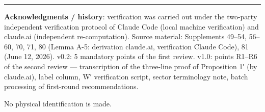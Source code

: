 \documentclass[
]{article}
\begin{document}
\begin{center}\rule{0.5\linewidth}{0.5pt}\end{center}

\textbf{Acknowledgments / history}: verification was carried out under
the two-party independent verification protocol of Claude Code (local
machine verification) and claude.ai (independent re-computation). Source
material: Supplements 49--54, 56--60, 70, 71, 80 (Lemma A-5: derivation
claude.ai, verification Claude Code), 81 (June 12, 2026). v0.2: 5
mandatory points of the first review. v1.0: points R1--R6 of the second
review --- transcription of the three-line proof of Proposition 1′ (by
claude.ai), label column, W′ verification script, sector terminology
note, batch processing of first-round recommendations.

No physical identification is made.
\end{document}
